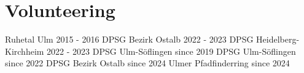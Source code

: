\documentclass{cv}
\begin{document}
        \section{Volunteering}
        \resumeSubHeadingListStart\vspace*{1mm}
            {Ruhetal Ulm}
            {2015 - 2016}
            {DPSG Bezirk Ostalb}
            {2022 - 2023}
            {DPSG Heidelberg-Kirchheim}
            {2022 - 2023}
            {DPSG Ulm-Söflingen}
            {since 2019}
            {DPSG Ulm-Söflingen}
            {since 2022}
            {DPSG Bezirk Ostalb}
            {since 2024}
            {Ulmer Pfadfinderring}
            {since 2024}
        \resumeSubHeadingListEnd
\end{document}

